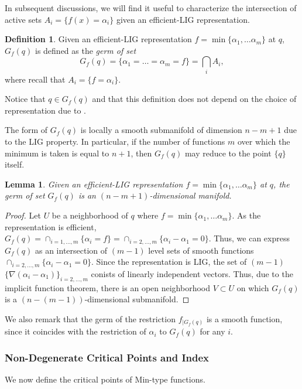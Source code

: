 \documentclass[11pt]{article}
\theoremstyle{plain}
\newtheorem{lem}{Lemma}
\theoremstyle{definition}
\newtheorem{defi}{Definition}
\theoremstyle{remark}
\begin{document}
	In subsequent discussions, we will find it useful to characterize the intersection of active sets $A_i = \{ f(x) = \alpha_i \}$ given an efficient-LIG representation. 
	
	\begin{defi}
		\label{def:G(x)}
		Given an efficient-LIG representation $f = \min \{\alpha_1, \ldots \alpha_m\}$ at $q$,  $G_f(q)$ is defined as the \emph{germ of set}
		$$
		G_f(q) = \{\alpha_1 = \ldots = \alpha_m = f\} = \bigcap_i A_i,
		$$
		where recall that $A_i = \{f = \alpha_i\}$. 
	\end{defi}
	Notice that $q \in G_f(q)$ and that this definition does not depend on the choice of representation due to .
	
	The form of $G_f(q)$ is locally a smooth submanifold of dimension $n-m+1$ due to the LIG property. In particular, if the number of functions $m$ over which the minimum is taken is equal to $n+1$, then $G_f(q)$ may reduce to the point $\{q\}$ itself.
	
	\begin{lem} \label{lem:G(q)_mfd} Given an efficient-LIG representation $f = \min \{\alpha_1, \ldots \alpha_m \}$ at $q$, the germ of set $G_f(q)$ is an $(n-m+1)$-dimensional manifold. 
	\end{lem}
	
	\begin{proof}
		Let $U$ be a neighborhood of $q$ where $f = \min \{\alpha_1, \ldots \alpha_m \}$. As the representation is efficient, $G_f(q) = \cap_{i = 1, \ldots, m} \{\alpha_i = f\} = \cap_{i= 2,\ldots,m}\{\alpha_i - \alpha_1 = 0\}$. Thus, we can express $G_f(q)$ as an intersection of $(m-1)$ level sets of smooth functions $\cap_{i= 2,\ldots,m}\{\alpha_i - \alpha_1 = 0\}$. Since the representation is LIG, the set of $(m-1)$ $\{\nabla (\alpha_i - \alpha_1)\}_{i = 2,\ldots, m}$ conists of linearly independent vectors. Thus, due to the implicit function theorem, there is an open neighborhood $V \subset U$ on which $G_f(q)$ is a $(n-(m-1))$-dimensional submanifold.
	\end{proof}
	
	We also remark that the germ of the restriction $f_{|G_f(q)}$ is a smooth function, since it coincides with the restriction of  $\alpha_i$ to $G_f(q)$ for any $i$.
	
	\subsubsection{Non-Degenerate Critical Points and Index}
	We now define the critical points of Min-type functions.
	
\end{document}
